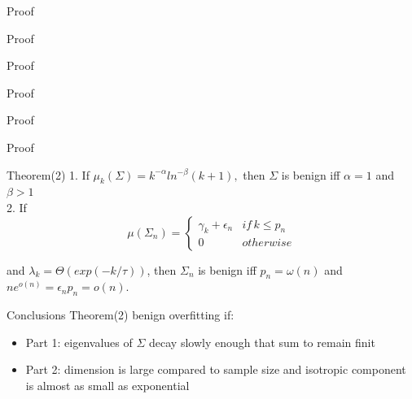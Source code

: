 \documentclass{beamer}
\begin{document}
\begin{frame}{Proof}
\end{frame}

\begin{frame}{Proof}
\end{frame}

\begin{frame}{Proof}
\end{frame}

\begin{frame}{Proof}
\end{frame}

\begin{frame}{Proof}
\end{frame}

\begin{frame}{Proof}
\end{frame}


\begin{frame}{Theorem(2)}
1. If $\mu_k(\Sigma) = k^{-\alpha}ln^{-\beta}(k+1), $ then $\Sigma$ is benign iff $\alpha = 1$ and $\beta > 1$\\

\vspace*{0.3 cm} 2. If
\begin{equation*}
	\mu(\Sigma_n) = \begin{cases}
		\gamma_k + \epsilon_n & if \, k \leq p_n \\
		0 & otherwise
	\end{cases}
\end{equation*}

and $\lambda_k = \Theta(exp(-k/\tau))$, then $\Sigma_n$ is benign iff $p_n = \omega(n)$ and $ne^{o(n)} = \epsilon_np_n = o(n).$
\end{frame}


\begin{frame}{Conclusions Theorem(2)}
	benign overfitting if:
\begin{itemize}
	\item Part 1: eigenvalues of $\Sigma$ decay slowly enough that sum to remain finit
	\item Part 2: dimension is large compared to sample size and isotropic component is almost as small as  exponential
\end{itemize}
\end{frame}
\end{document}

